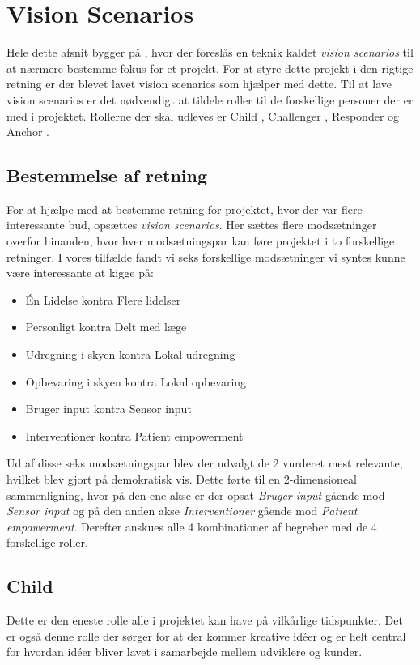 \section{Vision Scenarios}
Hele dette afsnit bygger på \citet[Sektion 17.1]{art:essence}, hvor der foreslås en teknik kaldet \textit{vision scenarios} til at nærmere bestemme fokus for et projekt.
For at styre dette projekt i den rigtige retning er der blevet lavet vision scenarios som hjælper med dette.
Til at lave vision scenarios er det nødvendigt at tildele roller til de forskellige personer der er med i projektet.
Rollerne der skal udleves er Child \citep[Kapitel 18]{art:essence}, Challenger \citep[Kapitel 19]{art:essence}, Responder \citep[Kapitel 20]{art:essence} og Anchor \citep[Kapitel 21]{art:essence}.

\subsection{Bestemmelse af retning}
For at hjælpe med at bestemme retning for projektet, hvor der var flere interessante bud, opsættes \textit{vision scenarios}.
Her sættes flere modsætninger overfor hinanden, hvor hver modsætningspar kan føre projektet i to forskellige retninger.
I vores tilfælde fandt vi seks forskellige modsætninger vi syntes kunne være interessante at kigge på:
\begin{itemize}
	\item Én Lidelse kontra Flere lidelser
	\item Personligt kontra Delt med læge
	\item Udregning i skyen kontra Lokal udregning
	\item Opbevaring i skyen kontra Lokal opbevaring
	\item Bruger input kontra Sensor input
	\item Interventioner kontra Patient empowerment
\end{itemize}

Ud af disse seks modsætningspar blev der udvalgt de 2 vurderet mest relevante, hvilket blev gjort på demokratisk vis.
Dette førte til en 2-dimensioneal sammenligning, hvor på den ene akse er der opsat \textit{Bruger input} gående mod \textit{Sensor input} og på den anden akse \textit{Interventioner} gående mod \textit{Patient empowerment}.
Derefter anskues alle 4 kombinationer af begreber med de 4 forskellige roller.



\subsection{Child}
Dette er den eneste rolle alle i projektet kan have på vilkårlige tidspunkter.
Det er også denne rolle der sørger for at der kommer kreative idéer og er helt central for hvordan idéer bliver lavet i samarbejde mellem udviklere og kunder.

